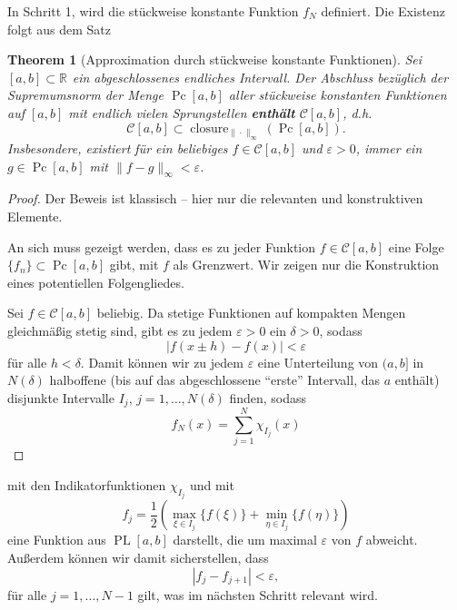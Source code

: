 \documentclass[
]{book}
\newtheorem{theorem}{Theorem}[chapter]
\theoremstyle{definition}
\theoremstyle{definition}
\theoremstyle{definition}
\theoremstyle{definition}
\theoremstyle{remark}
\begin{document}
In Schritt 1, wird die stückweise konstante Funktion \(f_N\) definiert. Die
Existenz folgt aus dem Satz

\begin{theorem}[Approximation durch stückweise konstante Funktionen]
\protect\hypertarget{thm:thm-pc-dense-C}{}\label{thm:thm-pc-dense-C}Sei \([a, b]\subset \mathbb R^{}\) ein abgeschlossenes endliches Intervall.
Der Abschluss bezüglich der Supremumsnorm der Menge \(\operatorname{Pc}[a, b]\) aller stückweise konstanten Funktionen auf \([a, b]\) mit endlich vielen Sprungstellen \textbf{enthält} \(\mathcal C[a, b]\), d.h.
\begin{equation*}
\mathcal{C}[a, b]\subset \operatorname{closure}_{\|\cdot\|_\infty}(\operatorname{Pc}[a, b]).
\end{equation*}
Insbesondere, existiert für ein beliebiges \(f\in \mathcal C[a, b]\) und \(\varepsilon > 0\), immer ein \(g\in \operatorname{Pc}[a, b]\) mit \(\|f-g\|_\infty<\varepsilon\).
\end{theorem}

\begin{proof}
Der Beweis ist klassisch -- hier nur die relevanten und konstruktiven Elemente.

An sich muss gezeigt werden, dass es zu jeder Funktion \(f\in \mathcal C[a, b]\) eine Folge \(\{f_n\}\subset \operatorname{Pc}[a, b]\) gibt, mit \(f\) als Grenzwert. Wir
zeigen nur die Konstruktion eines potentiellen Folgengliedes.

Sei \(f\in \mathcal{C}[a, b]\) beliebig. Da stetige Funktionen auf kompakten Mengen
gleichmäßig stetig sind, gibt es zu jedem \(\varepsilon>0\) ein \(\delta>0\), sodass
\begin{equation*}
|f(x\pm h) - f(x)| < \varepsilon
\end{equation*}
für alle \(h<\delta\). Damit können wir zu jedem \(\varepsilon\) eine
Unterteilung von \((a, b]\) in \(N(\delta)\) halboffene (bis auf das abgeschlossene
``erste'' Intervall, das \(a\) enthält) disjunkte Intervalle \(I_j\),
\(j=1, \dotsc, N(\delta)\) finden, sodass
\begin{equation*}
f_N(x) = \sum_{j=1}^N\chi_{I_j}(x)
\end{equation*}
\end{proof}

mit den Indikatorfunktionen \(\chi_{I_j}\) und mit
\begin{equation*}
f_j = \frac 12 (\max_{\xi\in I_j}\{f(\xi)\}+\min_{\eta \in I_j}\{f(\eta)\})
\end{equation*}
eine Funktion aus \(\operatorname{PL}[a, b]\) darstellt, die um maximal \(\varepsilon\) von \(f\)
abweicht. Außerdem können wir damit sicherstellen, dass
\begin{equation}\label{eq:eqn-fj-fjp-se}
|f_{j} - f_{j+1}| < \varepsilon,
\end{equation}
für alle \(j=1, \dotsc, N-1\) gilt, was im nächsten Schritt
relevant wird.
\end{document}
